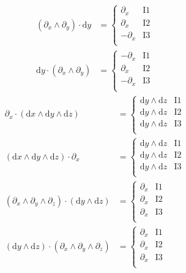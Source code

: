 \documentclass[\ifafour a4paper,12pt,\else a5paper,10pt,\fi%
onecolumn,oneside,article,%
british%
]{memoir}
\theoremstyle{remark}
\theoremstyle{innote}
\newcommand*{\de}{\partialup}%
\newcommand*{\di}{\mathrm{d}}%
\renewcommand*{\|}[1][]{\nonscript\,#1\vert\nonscript\;\mathopen{}}
\begin{document}
\begin{align}
  \label{eq:examples_choices_inner_two_y3}
  (\de_{x} \land \de_{y}) \cdot \di y &=
  \begin{cases}
    \de_{x} &\text{I1}\\
    \de_{x} &\text{I2}\\
    -\de_{x} &\text{I3}\\
  \end{cases}
\\
  \label{eq:examples_choices_inner_two_y4}
 \di y \cdot (\de_{x} \land \de_{y}) &=
  \begin{cases}
    -\de_{x} &\text{I1}\\
   \de_{x} &\text{I2}\\
    -\de_{x} &\text{I3}\\
  \end{cases}
\end{align}
\begin{align}
  \label{eq:examples_choices_inner_three}
 \de_{x} \cdot (\di x \land \di y \land \di z) &=
  \begin{cases}
    \di y \land \di z &\text{I1}\\
    \di y \land \di z &\text{I2}\\
    \di y \land \di z &\text{I3}\\
  \end{cases}
  \\
  (\di x \land \di y \land \di z) \cdot \de_{x} &=
  \begin{cases}
    \di y \land \di z &\text{I1}\\
    \di y \land \di z &\text{I2}\\
    \di y \land \di z &\text{I3}\\
  \end{cases}
  \\
  (\de_{x} \land \de_{y} \land \de_{z}) \cdot (\di y \land \di z) &=
  \begin{cases}
    \de_{x}  &\text{I1}\\
    \de_{x}  &\text{I2}\\
    \de_{x}  &\text{I3}\\
  \end{cases}
  \\
  (\di y \land \di z) \cdot (\de_{x} \land \de_{y} \land \de_{z})  &=
  \begin{cases}
    \de_{x} &\text{I1}\\
    \de_{x} &\text{I2}\\
    \de_{x} &\text{I3}\\
  \end{cases}
\end{align}
\end{document}
